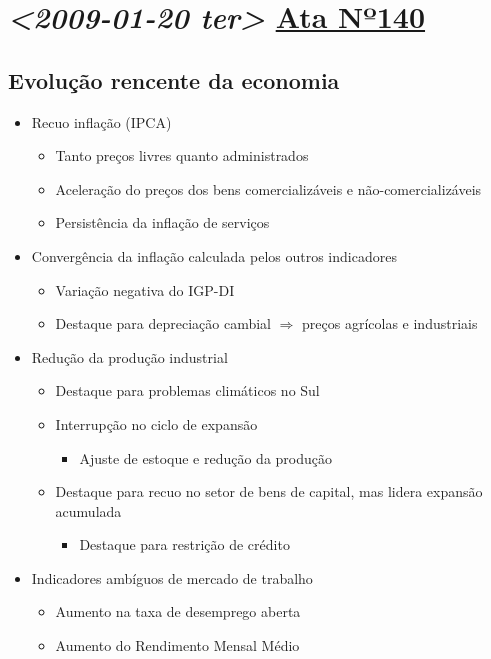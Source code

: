 \documentclass[11pt]{article}
\begin{document}
\section*{\textit{<2009-01-20 ter> } \href{https://www.bcb.gov.br/publicacoes/atascopom/21012009}{Ata Nº140}}
\label{sec:orgd8ad855}
\subsection*{Evolução rencente da economia}
\label{sec:org7be22ce}
\begin{itemize}
\item Recuo inflação (IPCA)
\begin{itemize}
\item Tanto preços livres quanto administrados
\item Aceleração do preços dos bens comercializáveis e não-comercializáveis
\item Persistência da inflação de serviços
\end{itemize}
\item Convergência da inflação calculada pelos outros indicadores
\begin{itemize}
\item Variação negativa do IGP-DI
\item Destaque para depreciação cambial \(\Rightarrow\) preços agrícolas e industriais
\end{itemize}
\item Redução da produção industrial
\begin{itemize}
\item Destaque para problemas climáticos no Sul
\item Interrupção no ciclo de expansão
\begin{itemize}
\item Ajuste de estoque e redução da produção
\end{itemize}
\item Destaque para recuo no setor de bens de capital, mas lidera expansão acumulada
\begin{itemize}
\item Destaque para restrição de crédito
\end{itemize}
\end{itemize}
\item Indicadores ambíguos de mercado de trabalho
\begin{itemize}
\item Aumento na taxa de desemprego aberta
\item Aumento do Rendimento Mensal Médio

\end{itemize}
\end{itemize}
\end{document}
